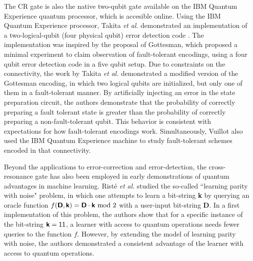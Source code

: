 \documentclass[aip,apr,twocolumn,showpacs,superscriptaddress,groupedaddress,nofootinbib,reprint]{revtex4-1}  %
\newcommand{\CR}{\textsf{CR}}
\newcommand{\etal}{\emph{et al.}}
\begin{document}
The \CR{} gate is also the native two-qubit gate available on the IBM Quantum Experience quantum processor\cite{IBMqexp}, which is accesible online. Using the IBM Quantum Experience processor, Takita \etal{}\cite{Takita2017} demonstrated an implementation of a two-logical-qubit (four physical qubit) error detection code \cite{Leung1997}. The implementation was inspired by the proposal of Gottesman\cite{Gottesman2016}, which proposed a minimal experiment to claim observation of fault-tolerant encodings\cite{Gottesman2009}, using a four qubit error detection code in a five qubit setup. Due to constraints on the connectivity, the work by Takita \etal{} demonstrated a modified version of the Gottesman encoding, in which two logical qubits are initialized, but only one of them in a fault-tolerant manner. By artificially injecting an error in the state preparation circuit, the authors demonstrate that the probability of correctly preparing a fault tolerant state is greater than the probability of correctly preparing a non-fault-tolerant qubit. This behavior is consistent with expectations for how fault-tolerant encodings work. Simultaneously, Vuillot\cite{Vuillot2017} also used the IBM Quantum Experience machine to study fault-tolerant schemes encoded in that connectivity.

Beyond the applications to error-correction and error-detection, the cross-resonance gate has also been employed in early demonstrations of quantum advantages in machine learning. Rist\'e \etal{}\cite{Riste2017} studied the so-called ``learning parity with noise" problem, in which one attempts to learn a bit-string \textsf{\textbf{k}} by querying an oracle function $f(\textsf{\textbf{D}},\textsf{\textbf{k}}) = \textsf{\textbf{D}}\cdot\textsf{\textbf{k}}\text{ mod }2$ with a user-input bit-string \textsf{\textbf{D}}. In a first implementation of this problem, the authors show that for a specific instance of the bit-string $\textsf{\textbf{k}} = \textsf{11}$, a learner with access to quantum operations needs fewer queries to the function $f$. However, by extending the model of learning parity with noise, the authors demonstrated a consistent advantage of the learner with access to quantum operations\cite{Riste2017}.
\end{document}
